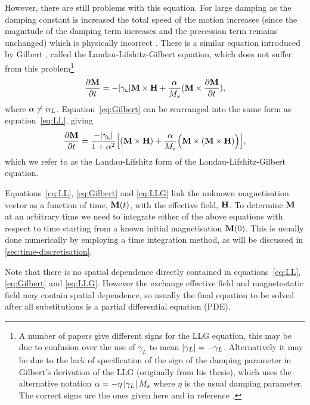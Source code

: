 However, there are still problems with this equation.
For large damping as the damping constant is increased the total speed of the motion increases (since the magnitude of the damping term increases and the precession term remains unchanged) which is physically incorrect \cite{Mallinson1987}.
There is a similar equation introduced by Gilbert \cite{Gilbert2004}, called the Landau-Lifshitz-Gilbert equation, which does not suffer from this problem\footnote{A number of papers give different signs for the LLG equation, this may be due to confusion over the use of $\gamma_L$ to mean $\left|{\gamma_L} \right| = -\gamma_L$. Alternatively it may be due to the lack of specification of the sign of the damping parameter in Gilbert's derivation of the LLG \cite{Gilbert2004} (originally from his thesis), which uses the alternative notation $\alpha = -\eta \left|{\gamma_L} \right| M_s$ where $\eta$ is the usual damping parameter. The correct signs are the ones given here and in reference \cite{Mallinson2000}.}
\begin{equation}
  \label{eq:Gilbert}
  \frac{\partial \mathbf{M}}{\partial t} = - {\left|{\gamma_{\text{\tiny{L}}}} \right|} \mathbf{M} \times \mathbf{H} + \frac{\alpha}{M_s} (\mathbf{M} \times \frac{\partial \mathbf{M}}{\partial t}),
\end{equation}
where $\alpha \neq \alpha_L$. Equation~\cref{eq:Gilbert} can be rearranged into the same form as equation~\cref{eq:LL}, giving
\begin{equation}
  \label{eq:LLG}
  \frac{\partial \mathbf{M}}{\partial t} = \frac{-{\left|{\gamma_{\text{\tiny{L}}}} \right|}}{1 + \alpha^2} \Big[ (\mathbf{M} \times \mathbf{H}) + \frac{\alpha}{M_s} \Big(\mathbf{M} \times (\mathbf{M} \times \mathbf{H}) \Big) \Big],
\end{equation}
which we refer to as the Landau-Lifshitz form of the Landau-Lifshitz-Gilbert equation.

Equations~\cref{eq:LL}, \cref{eq:Gilbert} and \cref{eq:LLG} link the unknown magnetisation vector as a function of time, $\mathbf{M}(t)$, with the effective field, $\mathbf{H}$.
To determine $\mathbf{M}$ at an arbitrary time we need to integrate either of the above equations with respect to time starting from a known initial magnetisation $\mathbf{M}(0)$.
This is usually done numerically by employing a time integration method, as will be discussed in \cref{sec:time-discretisation}.

Note that there is no spatial dependence directly contained in equations~\cref{eq:LL}, \cref{eq:Gilbert} and \cref{eq:LLG}.
However the exchange effective field and magnetostatic field may contain spatial dependence, so usually the final equation to be solved after all substitutions is a partial differential equation (PDE).



